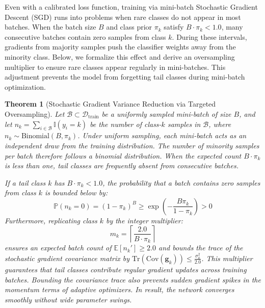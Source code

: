 \documentclass[10pt,journal,compsoc]{IEEEtran}
\newtheorem{theorem}{Theorem}
\begin{document}
Even with a calibrated loss function, training via mini-batch Stochastic Gradient Descent (SGD) runs into problems when rare classes do not appear in most batches. When the batch size $B$ and class prior $\pi_k$ satisfy $B \cdot \pi_k < 1.0$, many consecutive batches contain zero samples from class $k$. During these intervals, gradients from majority samples push the classifier weights away from the minority class. Below, we formalize this effect and derive an oversampling multiplier to ensure rare classes appear regularly in mini-batches. This adjustment prevents the model from forgetting tail classes during mini-batch optimization.

\begin{theorem}[Stochastic Gradient Variance Reduction via Targeted Oversampling]
\label{thm:gradient_starvation}
Let $\mathcal{B} \subset \mathcal{D}_{\text{train}}$ be a uniformly sampled mini-batch of size $B$, and let $n_k = \sum_{i \in \mathcal{B}} \mathbb{I}(y_i = k)$ be the number of class-$k$ samples in $\mathcal{B}$, where $n_k \sim \text{Binomial}(B, \pi_k)$. Under uniform sampling, each mini-batch acts as an independent draw from the training distribution. The number of minority samples per batch therefore follows a binomial distribution. When the expected count $B \cdot \pi_k$ is less than one, tail classes are frequently absent from consecutive batches.

If a tail class $k$ has $B \cdot \pi_k < 1.0$, the probability that a batch contains zero samples from class $k$ is bounded below by:
\begin{equation}
    \mathbb{P}(n_k = 0) = (1 - \pi_k)^B \ge \exp\left(-\frac{B \pi_k}{1 - \pi_k}\right) > 0
\end{equation}
Furthermore, replicating class $k$ by the integer multiplier:
\begin{equation}
    m_k = \left\lceil \frac{2.0}{B \cdot \pi_k} \right\rceil
\end{equation}
ensures an expected batch count of $\mathbb{E}[n_k'] \ge 2.0$ and bounds the trace of the stochastic gradient covariance matrix by $\text{Tr}(\text{Cov}(\mathbf{g}_k)) \le \frac{\sigma_k^2}{2.0}$. This multiplier guarantees that tail classes contribute regular gradient updates across training batches. Bounding the covariance trace also prevents sudden gradient spikes in the momentum terms of adaptive optimizers. In result, the network converges smoothly without wide parameter swings.
\end{theorem}
\end{document}
